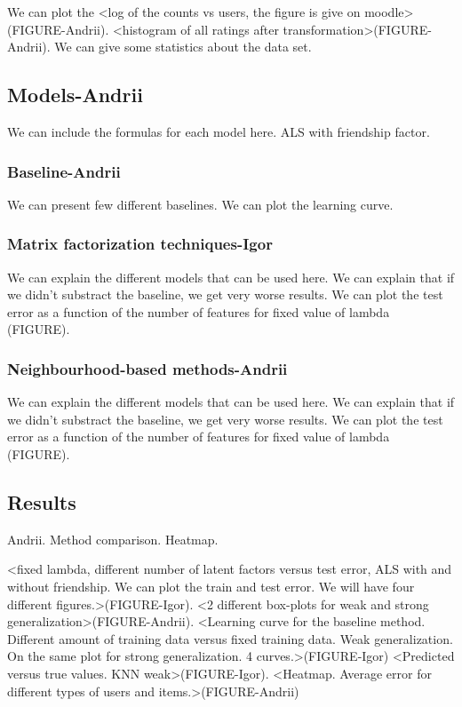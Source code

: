 \documentclass{article} %
\begin{document}
We can plot the <log of the counts vs users, the figure is give on moodle>(FIGURE-Andrii). <histogram of all ratings after transformation>(FIGURE-Andrii). We can give some statistics about the data set.

\subsection{Models-Andrii}

We can include the formulas for each model here. ALS with friendship factor.

\subsubsection{Baseline-Andrii}

We can present few different baselines. We can plot the learning curve.

\subsubsection{Matrix factorization techniques-Igor}

We can explain the different models that can be used here. We can explain that if we didn't substract the baseline, we get very worse results. We can plot the test error as a function of the number of features for fixed value of lambda (FIGURE).

\subsubsection{Neighbourhood-based methods-Andrii}

We can explain the different models that can be used here. We can explain that if we didn't substract the baseline, we get very worse results. We can plot the test error as a function of the number of features for fixed value of lambda (FIGURE).

\subsection{Results}

Andrii. Method comparison. Heatmap.

<fixed lambda, different number of latent factors versus test error, ALS with and without friendship. We can plot the train and test error. We will have four different figures.>(FIGURE-Igor). <2 different box-plots for weak and strong generalization>(FIGURE-Andrii). <Learning curve for the baseline method. Different amount of training data versus fixed training data. Weak generalization. On the same plot for strong generalization. 4 curves.>(FIGURE-Igor) <Predicted versus true values. KNN weak>(FIGURE-Igor). <Heatmap. Average error for different types of users and items.>(FIGURE-Andrii)
\end{document}
